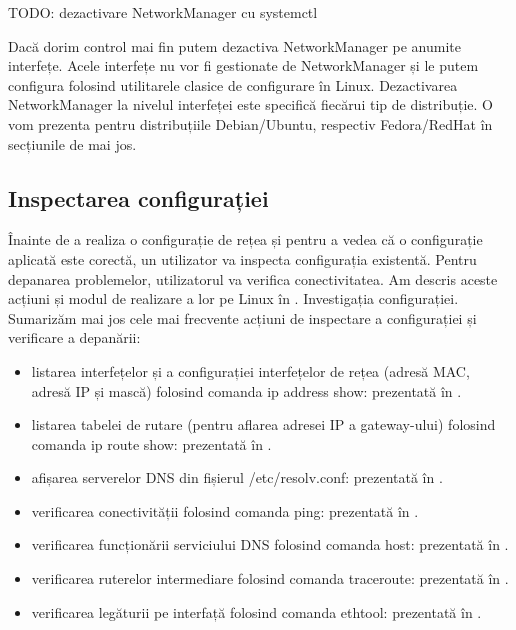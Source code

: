 \begin{screen}[caption={Dezactivarea NetworkManager},label={lst:net:nm-disable}]
TODO: dezactivare NetworkManager cu systemctl
\end{screen}

Dacă dorim control mai fin putem dezactiva NetworkManager pe anumite interfețe. Acele interfețe nu vor fi gestionate de NetworkManager și le putem configura folosind utilitarele clasice de configurare în Linux. Dezactivarea NetworkManager la nivelul interfeței este specifică fiecărui tip de distribuție. O vom prezenta pentru distribuțiile Debian/Ubuntu, respectiv Fedora/RedHat în secțiunile de mai jos.

\subsection{Inspectarea configurației}
\label{sec:net:config-inspect}

Înainte de a realiza o configurație de rețea și pentru a vedea că o configurație aplicată este corectă, un utilizator va inspecta configurația existentă. Pentru depanarea problemelor, utilizatorul va verifica conectivitatea. Am descris aceste acțiuni și modul de realizare a lor pe Linux în . Investigația configurației. Sumarizăm mai jos cele mai frecvente acțiuni de inspectare a configurației și verificare a depanării:

\begin{itemize}
  \item listarea interfețelor și a configurației interfețelor de rețea (adresă MAC, adresă IP și mască) folosind comanda ip address show: prezentată în .
  \item listarea tabelei de rutare (pentru aflarea adresei IP a gateway-ului) folosind comanda ip route show: prezentată în .
  \item afișarea serverelor DNS din fișierul /etc/resolv.conf: prezentată în .
  \item verificarea conectivității folosind comanda ping: prezentată în .
  \item verificarea funcționării serviciului DNS folosind comanda host: prezentată în .
  \item verificarea ruterelor intermediare folosind comanda traceroute: prezentată în .
  \item verificarea legăturii pe interfață folosind comanda ethtool: prezentată în .
\end{itemize}

